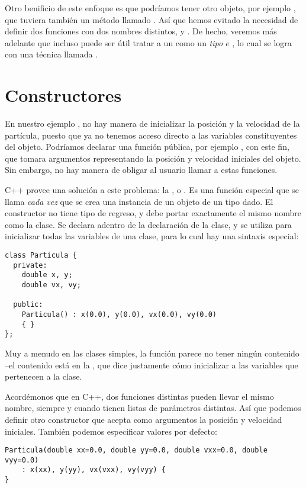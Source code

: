 Otro benificio de este enfoque es que podríamos tener otro objeto, por ejemplo , que tuviera también un método llamado . Así que hemos evitado la necesidad de definir dos funciones con dos nombres distintos,  y . De hecho, veremos más adelante que incluso puede ser útil tratar a un  como un \emph{tipo $e$} , lo cual se logra con una técnica llamada .

\section{Constructores}
En nuestro ejemplo , no hay manera de inicializar la posición y la velocidad de la partícula, puesto que ya no tenemos acceso directo a las variables constituyentes del objeto. Podríamos declarar una función pública, por ejemplo , con este fin, que tomara argumentos representando la posición y velocidad iniciales del objeto. Sin embargo, no hay manera de obligar al usuario llamar a estas funciones.

C++ provee una solución a este problema: la , o . Es una función especial que se llama \emph{cada vez} que se crea una instancia de un objeto de un tipo dado. El constructor no tiene tipo de regreso, y debe portar exactamente el mismo nombre como la clase. Se declara adentro de la declaración de la clase, y se utiliza para inicializar todas las variables de una clase, para lo cual hay una sintaxis especial:
\begin{lstlisting}
class Particula {
  private:
    double x, y;
    double vx, vy;

  public:
    Particula() : x(0.0), y(0.0), vx(0.0), vy(0.0) 
    { }
};  

\end{lstlisting}
Muy a menudo en las clases simples, la función parece no tener ningún contenido --el contenido está en la , que dice justamente cómo inicializar a las variables que pertenecen a la clase.


Acordémonos que en C++, dos funciones distintas pueden llevar el mismo nombre, siempre
y cuando tienen listas de parámetros distintas.  Así que podemos definir
otro constructor que acepta como argumentos la posición y velocidad iniciales. También podemos especificar valores por defecto:
\begin{lstlisting}
Particula(double xx=0.0, double yy=0.0, double vxx=0.0, double vyy=0.0) 
    : x(xx), y(yy), vx(vxx), vy(vyy) {
}	
\end{lstlisting}

